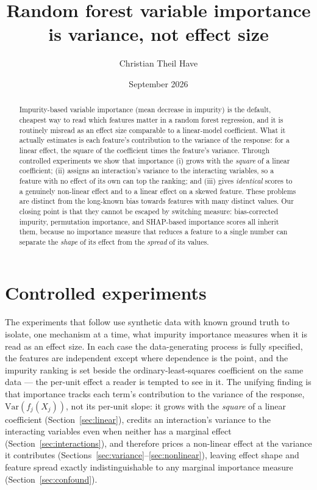 \documentclass[11pt]{article}
\title{Random forest variable importance is variance, not effect size}
\author{Christian Theil Have}
\date{September 2026}
\begin{document}
\maketitle

\begin{abstract}
Impurity-based variable importance (mean decrease in impurity) is the default,
cheapest way to read which features matter in a random forest regression, and it
is routinely misread as an effect size comparable to a linear-model coefficient.
What it actually estimates is each feature's contribution to the variance of the
response: for a linear effect, the square of the coefficient times the feature's
variance. Through controlled experiments we show that importance (i) grows with
the \emph{square} of a linear coefficient; (ii) assigns an interaction's
variance to the interacting variables, so a feature with no effect of its own
can top the ranking; and (iii) gives \emph{identical} scores to a genuinely
non-linear effect and to a linear effect on a skewed feature. These problems are
distinct from the long-known bias towards features with many distinct values.
Our closing point is that they cannot be escaped by switching measure:
bias-corrected impurity, permutation importance, and SHAP-based importance
scores all inherit them, because no importance measure that reduces a feature to
a single number can separate the \emph{shape} of its effect from the
\emph{spread} of its values.
\end{abstract}


\section{Controlled experiments}
The experiments that follow use synthetic data with known ground truth to isolate, one mechanism at a time, what impurity importance measures when it is read as an effect size. In each case the data-generating process is fully specified, the features are independent except where dependence is the point, and the impurity ranking is set beside the ordinary-least-squares coefficient on the same data --- the per-unit effect a reader is tempted to see in it. The unifying finding is that importance tracks each term's contribution to the variance of the response, $\mathrm{Var}(f_j(X_j))$, not its per-unit slope: it grows with the \emph{square} of a linear coefficient (Section~\ref{sec:linear}), credits an interaction's variance to the interacting variables even when neither has a marginal effect (Section~\ref{sec:interactions}), and therefore prices a non-linear effect at the variance it contributes (Sections~\ref{sec:variance}--\ref{sec:nonlinear}), leaving effect shape and feature spread exactly indistinguishable to any marginal importance measure (Section~\ref{sec:confound}).
  
  
  
  
  

\end{document}
